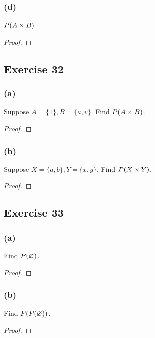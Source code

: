 \documentclass[14pt]{extarticle}
\let\mathscr\relax
\newcommand{\ps}{\mathscr{P}}
\newcommand{\es}{\varnothing}
\begin{document}
\subsubsection{(d)}
\(\ps(A \times B)\)

\begin{proof}

\end{proof}

\subsection{Exercise 32}

\subsubsection{(a)}
Suppose \(A = \{1\}, B = \{u, v\}\). Find \(\ps(A \times B)\).

\begin{proof}

\end{proof}

\subsubsection{(b)}
Suppose \(X = \{a,b\}, Y = \{x, y\}\). Find \(\ps(X \times Y)\).

\begin{proof}

\end{proof}

\subsection{Exercise 33}

\subsubsection{(a)}
Find \(\ps(\es)\).

\begin{proof}

\end{proof}

\subsubsection{(b)}
Find \(\ps(\ps(\es))\).

\begin{proof}

\end{proof}
\end{document}
